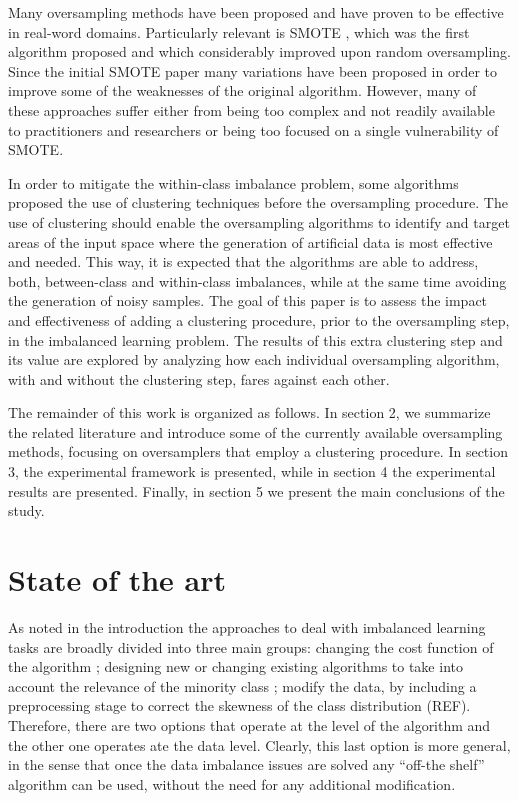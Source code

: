 \documentclass[parskip=full]{scrartcl}
\begin{document}
Many oversampling methods have been proposed and have proven to be effective in
real-word domains. Particularly relevant is SMOTE \cite{Chawla2002}, which was
the first algorithm  proposed and which considerably improved upon random
oversampling. Since the initial SMOTE paper many variations have been proposed
in order to improve some of the weaknesses of the original algorithm. However,
many of these approaches suffer either from being too complex and not readily
available to practitioners and researchers or being too focused on a single
vulnerability of SMOTE.

In order to mitigate the within-class imbalance problem, some algorithms
proposed the use of clustering techniques before the oversampling procedure. The
use of clustering should enable the oversampling algorithms to identify and
target areas of the input space where the generation of artificial data is most
effective and needed. This way, it is expected that the algorithms are able to
address, both, between-class and within-class imbalances, while at the same time
avoiding the generation of noisy samples. The goal of this paper is to assess
the impact and effectiveness of adding a clustering procedure, prior to the
oversampling step, in the imbalanced learning problem. The results of this extra
clustering step and its value are explored by analyzing how each individual
oversampling algorithm, with and without the clustering step, fares against each
other.

The remainder of this work is organized as follows. In section 2, we summarize
the related literature and introduce some of the currently available
oversampling methods, focusing on oversamplers that employ a clustering
procedure. In section 3, the experimental framework is presented, while in
section 4 the experimental results are presented. Finally, in section 5 we
present the main conclusions of the study.

\section{State of the art}

As noted in the introduction the approaches to deal with imbalanced learning
tasks are broadly divided into three main groups: changing the cost function of
the algorithm \cite{Wu2005}; designing new or changing existing algorithms to
take into account the relevance of the minority class \cite{Chawla2008}; modify
the data, by including a preprocessing stage to correct the skewness of the
class distribution (REF). Therefore, there are two options that operate at the
level of the algorithm and the other one operates ate the data level. Clearly,
this last option is more general, in the sense that once the data imbalance
issues are solved any “off-the shelf” algorithm can be used, without the need
for any additional modification.
\end{document}
